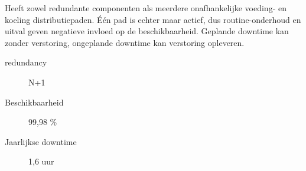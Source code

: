 Heeft zowel redundante componenten als meerdere onafhankelijke voeding- en koeling distributiepaden. \'E\'en pad is echter maar actief, dus routine-onderhoud en uitval geven negatieve invloed op de beschikbaarheid. Geplande downtime kan zonder verstoring, ongeplande downtime kan verstoring opleveren.
\begin{description}
\item[redundancy] N+1
\item[Beschikbaarheid] 99,98 \%
\item[Jaarlijkse downtime] 1,6 uur
\end{description}
